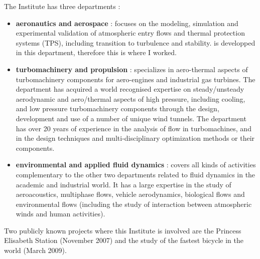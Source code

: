 The Institute has three departments :
\begin{itemize}
 \item \textbf{aeronautics and aerospace} : focuses on the modeling, simulation
and experimental validation of atmospheric entry flows and thermal protection
systems (TPS), including transition to turbulence and stability. \cf is
developped in this department, therefore this is where I worked.

 \item \textbf{turbomachinery and propulsion} : specializes in aero-thermal
aspects of turbomachinery components for aero-engines and industrial gas
turbines. The department has acquired a world recognised expertise on
steady/unsteady aerodynamic and aero/thermal aspects of high pressure, including
cooling, and low pressure turbomachinery components through the design,
development and use of a number of unique wind tunnels. The department has over
20 years of experience in the analysis of flow in turbomachines, and in the
design techniques and multi-disciplinary optimization methods or their
components.

 \item \textbf{environmental and applied fluid dynamics} : covers all kinds of
activities complementary to the other two departments related to fluid dynamics
in the academic and industrial world. It has a large expertise in the study of
aeroacoustics, multiphase flows, vehicle aerodynamics, biological  flows and
environmental flows (including the study of interaction between atmospheric
winds and human activities).
\end{itemize}

Two publicly known projects where this Institute is involved are the Princess
Elisabeth Station (November 2007) and the study of the fastest bicycle in the
world (March 2009).
